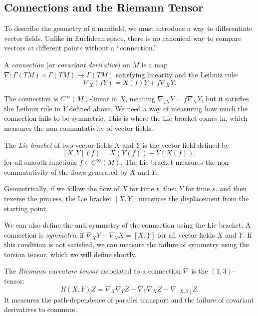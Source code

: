 \subsection{Connections and the Riemann Tensor} To describe the geometry of a manifold, we must introduce a way to differentiate vector fields. Unlike in Euclidean space, there is no canonical way to compare vectors at different points without a ``connection.''

\begin{definition}
  A \emph{connection} (or \emph{covariant derivative}) on $M$ is a map $\nabla : \Gamma(TM) \times \Gamma(TM) \to \Gamma(TM)$ satisfying linearity and the Leibniz rule:
  \[%
    \nabla_X (fY) = X(f) Y + f \nabla_X Y
  .\]%
\end{definition}

The connection is $C^\infty(M)$-linear in $X$, meaning $\nabla_{fX} Y = f\nabla_X Y$, but it satisfies the Leibniz rule in $Y$ defined above. We need a way of measuring how much the connection fails to be symmetric. This is where the Lie bracket comes in, which measures the non-commutativity of vector fields.

\begin{definition}
  The \emph{Lie bracket} of two vector fields $X$ and $Y$ is the vector field defined by
  \[%
    [X,Y](f) = X(Y(f)) - Y(X(f))
  ,\]%
  for all smooth functions $f \in C^\infty(M)$. The Lie bracket measures the non-commutativity of the flows generated by $X$ and $Y$.
\end{definition}

Geometrically, if we follow the flow of $X$ for time $t$, then $Y$ for time $s$, and then reverse the process, the Lie bracket $[X, Y]$ measures the displacement from the starting point.

We can also define the anti-symmetry of the connection using the Lie bracket. A connection is \emph{symmetric} if $\nabla_X Y - \nabla_Y X = [X,Y]$ for all vector fields $X$ and $Y$. If this condition is not satisfied, we can measure the failure of symmetry using the torsion tensor, which we will define shortly.

\begin{definition}
  The \emph{Riemann curvature tensor} associated to a connection $\nabla$ is the $(1,3)$-tensor:
  \[%
    R(X,Y)Z = \nabla_X \nabla_Y Z - \nabla_Y \nabla_X Z - \nabla_{[X,Y]} Z
  .\]%
  It measures the path-dependence of parallel transport and the failure of covariant derivatives to commute.
\end{definition}

